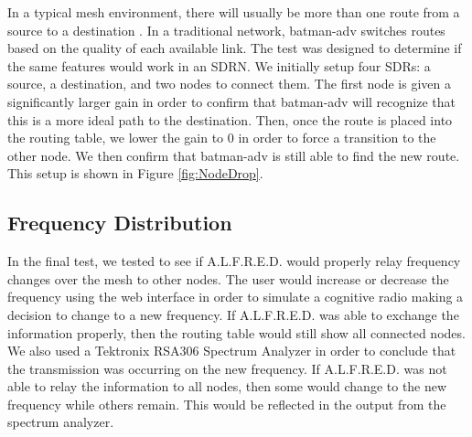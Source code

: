 In a typical mesh environment, there will usually be more than one route from a source to a destination \cite{Akyildiz2009810}. In a traditional network, batman-adv switches routes based on the quality of each available link. The test was designed to determine if the same features would work in an SDRN. We initially setup four SDRs: a source, a destination, and two nodes to connect them. The first node is given a significantly larger gain in order to confirm that batman-adv will recognize that this is a more ideal path to the destination. Then, once the route is placed into the routing table, we lower the gain to 0 in order to force a transition to the other node. We then confirm that batman-adv is still able to find the new route. This setup is shown in Figure \ref{fig:NodeDrop}.



\subsection{Frequency Distribution}

In the final test, we tested to see if A.L.F.R.E.D. would properly relay frequency changes over the mesh to other nodes. The user would increase or decrease the frequency using the web interface in order to simulate a cognitive radio making a decision to change to a new frequency. If A.L.F.R.E.D. was able to exchange the information properly, then the routing table would still show all connected nodes. We also used a Tektronix RSA306 Spectrum Analyzer in order to conclude that the transmission was occurring on the new frequency. If A.L.F.R.E.D. was not able to relay the information to all nodes, then some would change to the new frequency while others remain. This would be reflected in the output from the spectrum analyzer. 




